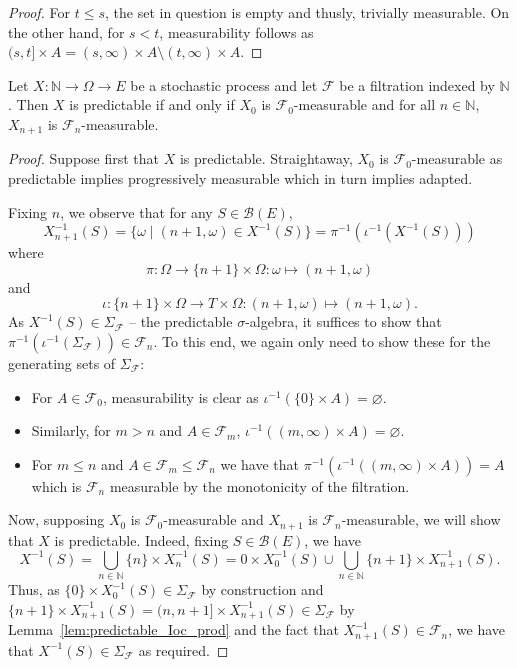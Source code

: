 \begin{proof}For $t \le s$, the set in question is empty and thusly, trivially measurable. On the other hand, for $s < t$, measurability follows as
$(s, t] \times A = (s, \infty) \times A \setminus (t, \infty) \times A$.
\end{proof}


\begin{lemma}\label{lem:predictable_nat_iff}
  \mathlibok
Let $X : \mathbb{N} \to \Omega \to E$ be a stochastic process and let $\mathcal{F}$ be a filtration indexed by $\mathbb{N}$.
Then $X$ is predictable if and only if $X_0$ is $\mathcal{F}_0$-measurable and for all $n \in \mathbb{N}$, $X_{n+1}$ is $\mathcal{F}_n$-measurable.
\end{lemma}


\begin{proof}  
Suppose first that $X$ is predictable. Straightaway, $X_0$ is $\mathcal{F}_0$-measurable as predictable implies progressively measurable which in turn implies adapted.

Fixing $n$, we observe that for any $S \in \mathcal{B}(E)$,
$$X_{n + 1}^{-1}(S) = \{\omega \mid (n + 1, \omega) \in X^{-1}(S)\} = \pi^{-1}(\iota^{-1}(X^{-1}(S)))$$
where
$$\pi : \Omega \to \{n + 1\} \times \Omega : \omega \mapsto (n + 1, \omega)$$
and
$$\iota : \{n + 1\} \times \Omega \to T \times \Omega : (n + 1, \omega) \mapsto (n + 1, \omega).$$
As $X^{-1}(S) \in \Sigma_{\mathcal{F}}$ -- the predictable $\sigma$-algebra, it suffices to show that $\pi^{-1}(\iota^{-1}(\Sigma_{\mathcal{F}})) \in \mathcal{F}_n$. To this end, we again only need to show these for the generating sets of $\Sigma_{\mathcal{F}}$:
\begin{itemize}
    \item For $A \in \mathcal{F}_0$, measurability is clear as $\iota^{-1}(\{0\} \times A) = \varnothing$.
    \item Similarly, for $m > n$ and $A \in \mathcal{F}_m$, $\iota^{-1}((m, \infty) \times A) = \varnothing$.
    \item For $m \le n$ and $A \in \mathcal{F}_m \le \mathcal{F}_n$ we have that $\pi^{-1}(\iota^{-1}((m, \infty) \times A)) = A$ which is $\mathcal{F}_n$ measurable by the monotonicity of the filtration.
\end{itemize}

Now, supposing $X_0$ is $\mathcal{F}_0$-measurable and $X_{n + 1}$ is $\mathcal{F}_n$-measurable, we will show that $X$ is predictable. Indeed, fixing $S \in \mathcal{B}(E)$, we have
$$X^{-1}(S) = \bigcup_{n \in \mathbb{N}} \{n\} \times X_n^{-1}(S) = {0} \times X_0^{-1}(S) \cup \bigcup_{n \in \mathbb{N}} \{n + 1\} \times X_{n + 1}^{-1}(S).$$
Thus, as $\{0\} \times X_0^{-1}(S) \in \Sigma_{\mathcal{F}}$ by construction and $\{n + 1\} \times X_{n + 1}^{-1}(S) = (n, n + 1] \times X_{n + 1}^{-1}(S) \in \Sigma_{\mathcal{F}}$ by Lemma~\ref{lem:predictable_Ioc_prod} and the fact that $X_{n + 1}^{-1}(S) \in \mathcal{F}_n$, we have that $X^{-1}(S) \in \Sigma_{\mathcal{F}}$ as required.
\end{proof}



